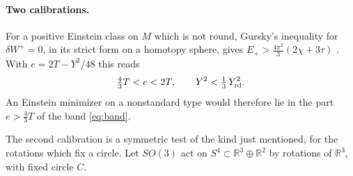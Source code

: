 
\paragraph{Two calibrations.}
For a positive Einstein class on \(M\) which is not round, Gursky's
inequality for \(\delta W^+=0\), in its strict form on a homotopy
sphere, gives \(E_+>\tfrac{4\pi^2}{3}(2\chi+3\tau)\)
\cite{Gursky2000EinsteinConstants}%
\cite[Strict half-harmonic bound]{Baker2026MarkedNecks}. With
\(e=2T-Y^2/48\) this reads
\[
 \tfrac43T<e<2T,\qquad Y^2<\tfrac13\,Y_{\rm rd}^2 .
\]
An Einstein minimizer on a nonstandard type would therefore lie in the
part \(e>\tfrac43T\) of the band \eqref{eq:band}.

The second calibration is a symmetric test of the kind just mentioned,
for the rotations which fix a circle. Let \(SO(3)\) act on
\(S^4\subset\mathbb R^3\oplus\mathbb R^2\) by rotations of
\(\mathbb R^3\), with fixed circle \(C\).


